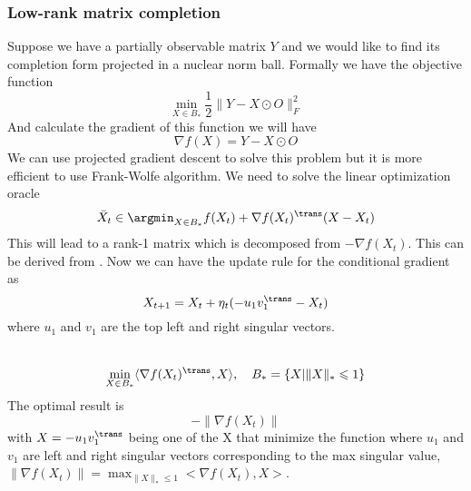 \subsubsection{Low-rank matrix completion}
Suppose we have a partially observable matrix $Y$ and we would like to 
find its completion form projected in a nuclear norm ball. Formally we have the objective function
\[
\min_{X\in B_*}\frac{1}{2}\|Y-X \odot O\|_F^2
\]
And calculate the gradient of this function we will have
\[
\nabla f(X) = Y-X \odot O
\]
We can use projected gradient descent to solve this problem but it is more efficient to use Frank-Wolfe algorithm. We need to solve the linear optimization oracle
\[
\bar{X}_t\in \argmin_{X\in{B_*}}f(X_t)+\nabla f(X_t)^\trans(X-X_t)
\]
This will lead to a rank-1 matrix which is decomposed from $-\nabla f(X_t)$. This can be derived from . Now we can have the update rule for the conditional gradient as
\[
X_{t+1} = X_t + \eta_t(-u_1v_1^\trans - X_t)
\]
where $u_1$ and $v_1$ are the top left and right singular vectors.\\ \\

\begin{lemma}
\[
\min_{X\in B_*}\langle\nabla f(X_t)^\trans,X\rangle,\quad B_*=\{X|\|X\|_*\leqslant 1\}
\]
The optimal result is \[-\|\nabla f(X_t)\|\] with $X=-u_1v_1^\trans$ being one of the X that minimize the function where
$u_1$ and $v_1$ are left and right singular vectors corresponding to the max singular value, $\|\nabla f(X_t)\|=\max_{\|X\|_*\leqslant 1}<\nabla f(X_t),X>$.\\
\end{lemma}

